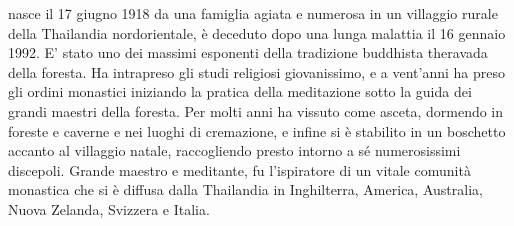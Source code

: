 
\clearpage
\thispagestyle{empty}

{\scshape \theauthor} nasce il 17 giugno 1918 da una famiglia agiata e numerosa in
un villaggio rurale della Thailandia nordorientale, è deceduto dopo una
lunga malattia il 16 gennaio 1992. E' stato uno dei massimi esponenti
della tradizione buddhista theravada della foresta. Ha intrapreso gli
studi religiosi giovanissimo, e a vent'anni ha preso gli ordini
monastici iniziando la pratica della meditazione sotto la guida dei
grandi maestri della foresta. Per molti anni ha vissuto come asceta,
dormendo in foreste e caverne e nei luoghi di cremazione, e infine si è
stabilito in un boschetto accanto al villaggio natale, raccogliendo
presto intorno a sé numerosissimi discepoli. Grande maestro e meditante,
fu l'ispiratore di un vitale comunità monastica che si è diffusa dalla
Thailandia in Inghilterra, America, Australia, Nuova Zelanda, Svizzera e
Italia.


